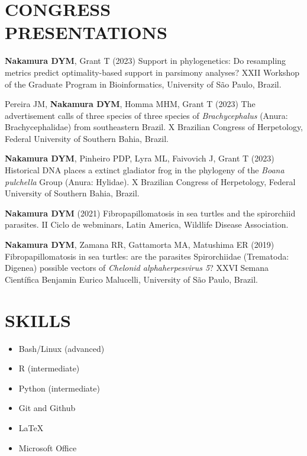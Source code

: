 \documentclass[margin, 10pt]{res} %
\begin{document}
\begin{resume}

\section{CONGRESS \\ PRESENTATIONS}

\begin{etaremune}
\item \textbf{Nakamura DYM}, Grant T (2023) Support in phylogenetics: Do resampling metrics predict optimality-based support in parsimony analyses? XXII Workshop of the Graduate Program in Bioinformatics, University of São Paulo, Brazil.
\item Pereira JM, \textbf{Nakamura DYM}, Homma MHM, Grant T (2023) The advertisement calls of three species of three species of \emph{Brachycephalus} (Anura: Brachycephalidae) from southeastern Brazil. X Brazilian Congress of Herpetology, Federal University of Southern Bahia, Brazil. 
\item \textbf{Nakamura DYM}, Pinheiro PDP, Lyra ML, Faivovich J, Grant T (2023) Historical DNA places a  extinct gladiator frog in the phylogeny of the \emph{Boana pulchella} Group (Anura: Hylidae). X Brazilian Congress of Herpetology, Federal University of Southern Bahia, Brazil. 
\item \textbf{Nakamura DYM} (2021) Fibropapillomatosis in sea turtles and the spirorchiid parasites. II Ciclo de webminars, Latin America, Wildlife Disease Association.
\item \textbf{Nakamura DYM}, Zamana RR, Gattamorta MA, Matushima ER (2019) Fibropapillomatosis in sea turtles: are the parasites Spirorchiidae (Trematoda: Digenea) possible vectors of \textit{Chelonid alphaherpesvirus 5}? XXVI Semana Científica Benjamin Eurico Malucelli, University of São Paulo, Brazil.
\end{etaremune}


\section{SKILLS}

\begin{itemize}
\item Bash/Linux (advanced)
\item R (intermediate)
\item Python (intermediate)
\item Git and Github
\item LaTeX
\item Microsoft Office
\end{itemize}


\end{resume}
\end{document}
